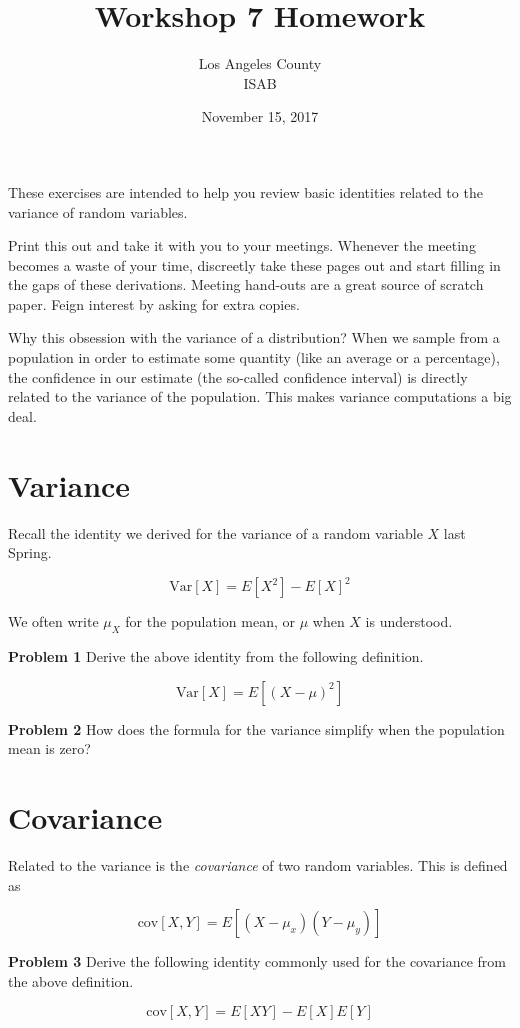 \documentclass[]{article}
\title{Workshop 7 Homework}
\author{Los Angeles County\\ISAB}
\date{November 15, 2017}
\begin{document}
\maketitle
These exercises are intended to help you review basic identities
related to the variance of random variables.

Print this out and take it with you to your meetings.
Whenever the meeting becomes a waste of your time, discreetly take
these pages out and start filling in the gaps of these derivations.
Meeting hand-outs are a great source of scratch paper.
Feign interest by asking for extra copies.

Why this obsession with the variance of a distribution?
When we sample from a population in order to estimate some
quantity (like an average or a percentage), the confidence
in our estimate (the so-called confidence interval) is directly
related to the variance of the population.  This makes
variance computations a big deal.


\section*{Variance}

Recall the identity we derived for the variance of a random
variable $X$ last Spring.

$$
\mbox{Var}[X] = E[X^2] - E[X]^2
$$

We often write $\mu_X$ for the population mean, or $\mu$ when
$X$ is understood.

\textbf{Problem 1} Derive the above identity from the
following definition.

$$
\mbox{Var}[X] = E\left[ (X - \mu)^2 \right]
$$

\textbf{Problem 2} How does the formula for the variance
simplify when the population mean is zero?


\section*{Covariance}

Related to the variance is the \emph{covariance} of two random
variables.  This is defined as

$$
\mbox{cov}[X,Y] = E\left[(X-\mu_x)(Y-\mu_y) \right]
$$

\textbf{Problem 3} Derive the following identity commonly
used for the covariance from the above definition.

$$
\mbox{cov}[X,Y] = E[XY] - E[X]E[Y]
$$
\end{document}
